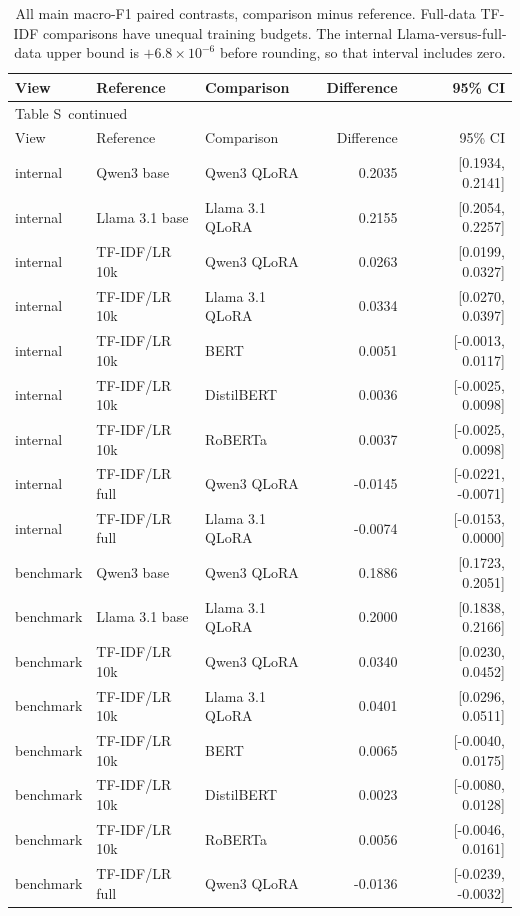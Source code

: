 \documentclass[10pt,a4paper]{article}
\renewcommand{\thetable}{S\arabic{table}}
\begin{document}
{\small
\setlength{\tabcolsep}{4pt}
\begin{longtable}{@{}lllrr@{}}
\caption{All main macro-F1 paired contrasts, comparison minus reference. Full-data TF-IDF comparisons have unequal training budgets. The internal Llama-versus-full-data upper bound is $+6.8\times10^{-6}$ before rounding, so that interval includes zero.}\label{sup:contrasts}\\
\toprule
View & Reference & Comparison & Difference & 95\% CI \\
\midrule\endfirsthead
\multicolumn{5}{l}{\small Table \thetable\ continued}\\
\toprule
View & Reference & Comparison & Difference & 95\% CI \\
\midrule\endhead
\bottomrule\endfoot
internal & Qwen3 base & Qwen3 QLoRA & 0.2035 & [0.1934, 0.2141] \\
internal & Llama 3.1 base & Llama 3.1 QLoRA & 0.2155 & [0.2054, 0.2257] \\
internal & TF-IDF/LR 10k & Qwen3 QLoRA & 0.0263 & [0.0199, 0.0327] \\
internal & TF-IDF/LR 10k & Llama 3.1 QLoRA & 0.0334 & [0.0270, 0.0397] \\
internal & TF-IDF/LR 10k & BERT & 0.0051 & [-0.0013, 0.0117] \\
internal & TF-IDF/LR 10k & DistilBERT & 0.0036 & [-0.0025, 0.0098] \\
internal & TF-IDF/LR 10k & RoBERTa & 0.0037 & [-0.0025, 0.0098] \\
internal & TF-IDF/LR full & Qwen3 QLoRA & -0.0145 & [-0.0221, -0.0071] \\
internal & TF-IDF/LR full & Llama 3.1 QLoRA & -0.0074 & [-0.0153, 0.0000] \\
benchmark & Qwen3 base & Qwen3 QLoRA & 0.1886 & [0.1723, 0.2051] \\
benchmark & Llama 3.1 base & Llama 3.1 QLoRA & 0.2000 & [0.1838, 0.2166] \\
benchmark & TF-IDF/LR 10k & Qwen3 QLoRA & 0.0340 & [0.0230, 0.0452] \\
benchmark & TF-IDF/LR 10k & Llama 3.1 QLoRA & 0.0401 & [0.0296, 0.0511] \\
benchmark & TF-IDF/LR 10k & BERT & 0.0065 & [-0.0040, 0.0175] \\
benchmark & TF-IDF/LR 10k & DistilBERT & 0.0023 & [-0.0080, 0.0128] \\
benchmark & TF-IDF/LR 10k & RoBERTa & 0.0056 & [-0.0046, 0.0161] \\
benchmark & TF-IDF/LR full & Qwen3 QLoRA & -0.0136 & [-0.0239, -0.0032] \\

\end{longtable}}
\end{document}
